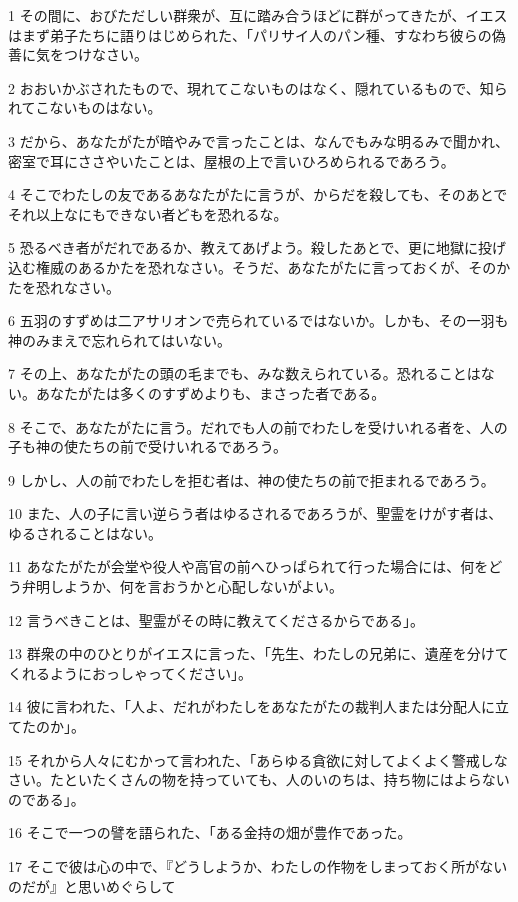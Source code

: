 \par 1 その間に、おびただしい群衆が、互に踏み合うほどに群がってきたが、イエスはまず弟子たちに語りはじめられた、「パリサイ人のパン種、すなわち彼らの偽善に気をつけなさい。
\par 2 おおいかぶされたもので、現れてこないものはなく、隠れているもので、知られてこないものはない。
\par 3 だから、あなたがたが暗やみで言ったことは、なんでもみな明るみで聞かれ、密室で耳にささやいたことは、屋根の上で言いひろめられるであろう。
\par 4 そこでわたしの友であるあなたがたに言うが、からだを殺しても、そのあとでそれ以上なにもできない者どもを恐れるな。
\par 5 恐るべき者がだれであるか、教えてあげよう。殺したあとで、更に地獄に投げ込む権威のあるかたを恐れなさい。そうだ、あなたがたに言っておくが、そのかたを恐れなさい。
\par 6 五羽のすずめは二アサリオンで売られているではないか。しかも、その一羽も神のみまえで忘れられてはいない。
\par 7 その上、あなたがたの頭の毛までも、みな数えられている。恐れることはない。あなたがたは多くのすずめよりも、まさった者である。
\par 8 そこで、あなたがたに言う。だれでも人の前でわたしを受けいれる者を、人の子も神の使たちの前で受けいれるであろう。
\par 9 しかし、人の前でわたしを拒む者は、神の使たちの前で拒まれるであろう。
\par 10 また、人の子に言い逆らう者はゆるされるであろうが、聖霊をけがす者は、ゆるされることはない。
\par 11 あなたがたが会堂や役人や高官の前へひっぱられて行った場合には、何をどう弁明しようか、何を言おうかと心配しないがよい。
\par 12 言うべきことは、聖霊がその時に教えてくださるからである」。
\par 13 群衆の中のひとりがイエスに言った、「先生、わたしの兄弟に、遺産を分けてくれるようにおっしゃってください」。
\par 14 彼に言われた、「人よ、だれがわたしをあなたがたの裁判人または分配人に立てたのか」。
\par 15 それから人々にむかって言われた、「あらゆる貪欲に対してよくよく警戒しなさい。たといたくさんの物を持っていても、人のいのちは、持ち物にはよらないのである」。
\par 16 そこで一つの譬を語られた、「ある金持の畑が豊作であった。
\par 17 そこで彼は心の中で、『どうしようか、わたしの作物をしまっておく所がないのだが』と思いめぐらして
